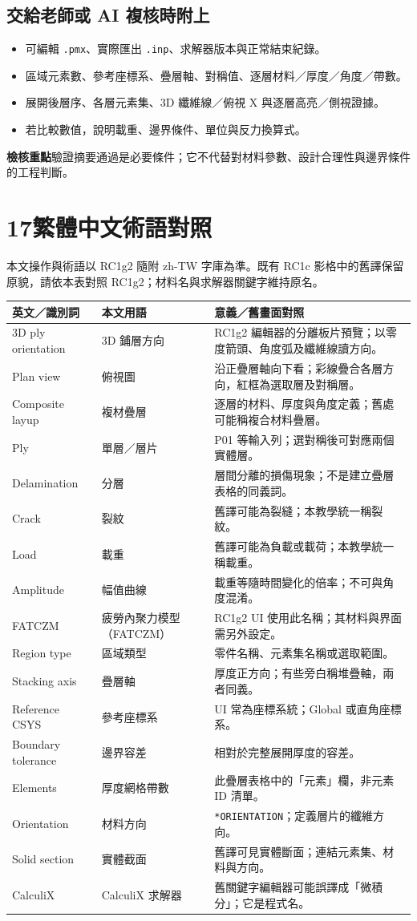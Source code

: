 \documentclass[11pt,a4paper,fontset=none]{ctexart}
\newcommand{\page}[1]{\clearpage\section*{#1}\addcontentsline{toc}{section}{#1}}
\newcommand{\note}[1]{\par\smallskip\noindent\colorbox{light}{\parbox{\dimexpr\linewidth-2\fboxsep\relax}{\textbf{檢核重點}\quad #1}}\par\smallskip}
\begin{document}
\subsection*{交給老師或 AI 複核時附上}
\begin{itemize}
\item 可編輯 \texttt{.pmx}、實際匯出 \texttt{.inp}、求解器版本與正常結束紀錄。
\item 區域元素數、參考座標系、疊層軸、對稱值、逐層材料／厚度／角度／帶數。
\item 展開後層序、各層元素集、3D 纖維線／俯視 X 與逐層高亮／側視證據。
\item 若比較數值，說明載重、邊界條件、單位與反力換算式。
\end{itemize}
\note{驗證摘要通過是必要條件；它不代替對材料參數、設計合理性與邊界條件的工程判斷。}
\page{17\quad 繁體中文術語對照}
本文操作與術語以 RC1g2 隨附 zh-TW 字庫為準。既有 RC1c 影格中的舊譯保留原貌，請依本表對照 RC1g2；材料名與求解器關鍵字維持原名。
\par\noindent\begin{tabularx}{\linewidth}{@{}P{38mm}P{44mm}Y@{}}\toprule
英文／識別詞 & 本文用語 & 意義／舊畫面對照 \\\midrule
3D ply orientation & 3D 鋪層方向 & RC1g2 編輯器的分離板片預覽；以零度箭頭、角度弧及纖維線讀方向。 \\
Plan view & 俯視圖 & 沿正疊層軸向下看；彩線疊合各層方向，紅框為選取層及對稱層。 \\
Composite layup & 複材疊層 & 逐層的材料、厚度與角度定義；舊處可能稱複合材料疊層。 \\
Ply & 單層／層片 & P01 等輸入列；選對稱後可對應兩個實體層。 \\
Delamination & 分層 & 層間分離的損傷現象；不是建立疊層表格的同義詞。 \\
Crack & 裂紋 & 舊譯可能為裂縫；本教學統一稱裂紋。 \\
Load & 載重 & 舊譯可能為負載或載荷；本教學統一稱載重。 \\
Amplitude & 幅值曲線 & 載重等隨時間變化的倍率；不可與角度混淆。 \\
FATCZM & 疲勞內聚力模型（FATCZM） & RC1g2 UI 使用此名稱；其材料與界面需另外設定。 \\
Region type & 區域類型 & 零件名稱、元素集名稱或選取範圍。 \\
Stacking axis & 疊層軸 & 厚度正方向；有些旁白稱堆疊軸，兩者同義。 \\
Reference CSYS & 參考座標系 & UI 常為座標系統；Global 或直角座標系。 \\
Boundary tolerance & 邊界容差 & 相對於完整展開厚度的容差。 \\
Elements & 厚度網格帶數 & 此疊層表格中的「元素」欄，非元素 ID 清單。 \\
Orientation & 材料方向 & \texttt{*ORIENTATION}；定義層片的纖維方向。 \\
Solid section & 實體截面 & 舊譯可見實體斷面；連結元素集、材料與方向。 \\
CalculiX & CalculiX 求解器 & 舊關鍵字編輯器可能誤譯成「微積分」；它是程式名。 \\\bottomrule
\end{tabularx}\par
\end{document}
